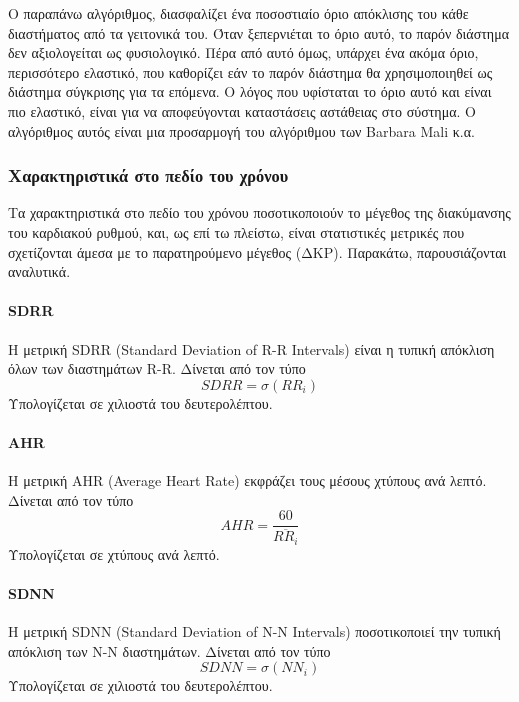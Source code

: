Ο παραπάνω αλγόριθμος, διασφαλίζει ένα ποσοστιαίο όριο απόκλισης του κάθε διαστήματος από τα γειτονικά του. Όταν ξεπερνιέται το όριο αυτό, το παρόν διάστημα δεν αξιολογείται ως φυσιολογικό. Πέρα από αυτό όμως, υπάρχει ένα ακόμα όριο, περισσότερο ελαστικό, που καθορίζει εάν το παρόν διάστημα θα χρησιμοποιηθεί ως διάστημα σύγκρισης για τα επόμενα. Ο λόγος που υφίσταται το όριο αυτό και είναι πιο ελαστικό, είναι για να αποφεύγονται καταστάσεις αστάθειας στο σύστημα. Ο αλγόριθμος αυτός είναι μια προσαρμογή του αλγόριθμου των Barbara Mali κ.α. \cite{barbara_mali_alg}

\subsubsection{Χαρακτηριστικά στο πεδίο του χρόνου}

Τα χαρακτηριστικά στο πεδίο του χρόνου ποσοτικοποιούν το μέγεθος της διακύμανσης του καρδιακού ρυθμού, και, ως επί τω πλείστω, είναι στατιστικές μετρικές που σχετίζονται άμεσα με το παρατηρούμενο μέγεθος (ΔΚΡ). Παρακάτω, παρουσιάζονται αναλυτικά.


\paragraph{SDRR}
Η μετρική SDRR (Standard Deviation of R-R Intervals) είναι η τυπική απόκλιση όλων των διαστημάτων  R-R. Δίνεται από τον τύπο
\begin{equation}
\label{eq:SDRR}
   SDRR=\sigma(RR_i)
\end{equation}
Υπολογίζεται σε χιλιοστά του δευτερολέπτου.

\paragraph{AHR}
Η μετρική AHR (Average Heart Rate) εκφράζει τους μέσους χτύπους ανά λεπτό. Δίνεται από τον τύπο
\begin{equation}
\label{eq:AHR}
   AHR=\frac{60}{\overline{RR_i}}
\end{equation}
Υπολογίζεται σε χτύπους ανά λεπτό.

\paragraph{SDNN}
Η μετρική SDNN (Standard Deviation of N-N Intervals)  ποσοτικοποιεί την τυπική απόκλιση των Ν-Ν διαστημάτων. Δίνεται από τον τύπο
\begin{equation}
\label{eq:SDRR}
   SDNN=\sigma(NN_i)
\end{equation}
Υπολογίζεται σε χιλιοστά του δευτερολέπτου.

